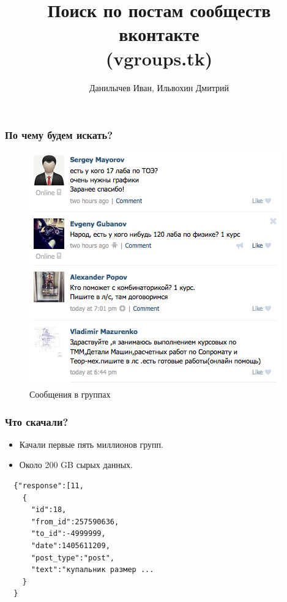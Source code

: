\documentclass{beamer}
\title[Информационный поиск]{Поиск по постам сообществ вконтакте \\ (vgroups.tk)}
\author{Данилычев Иван, Ильвохин Дмитрий}
\institute{Московский Авиационый Институт}
\date{}
\begin{document}
\newcommand{\errorband}[5][]
{ %
\pgfplotstableread[col sep=comma, skip first n=1]{#2}\datatable
  \addplot [draw=none, stack plots=y, forget plot] table
  [
      x={#3},
      y expr=\thisrow{#4}-2*\thisrow{#5}
  ] {\datatable};

  \addplot [draw=none, fill=gray!40, stack plots=y, area legend, #1] table
  [
      x={#3},
      y expr=4*\thisrow{#5}
  ] {\datatable} \closedcycle;

  \addplot [forget plot, stack plots=y,draw=none] table [x={#3}, y expr=-(\thisrow{#4}+2*\thisrow{#5})] {\datatable};
}

\begin{frame}
  \titlepage
\end{frame}

\begin{frame}
  \frametitle{По чему будем искать?}
    \begin{figure}[!htb]
      \centering
      \includegraphics[scale=0.35]{pics/posts.png}
      \caption{Сообщения в группах}
      \label{fig:posts}
    \end{figure}
\end{frame}

\begin{frame}[fragile]
  \frametitle{Что скачали?}
  \begin{itemize}
    \item Качали первые пять миллионов групп.
    \item Около 200 GB сырых данных.
  \end{itemize}

\begin{verbatim}
  {"response":[11,
    {
      "id":18,
      "from_id":257590636,
      "to_id":-4999999,
      "date":1405611209,
      "post_type":"post",
      "text":"купальник размер ...
    }
  }
\end{verbatim}

\end{frame}
\end{document}
